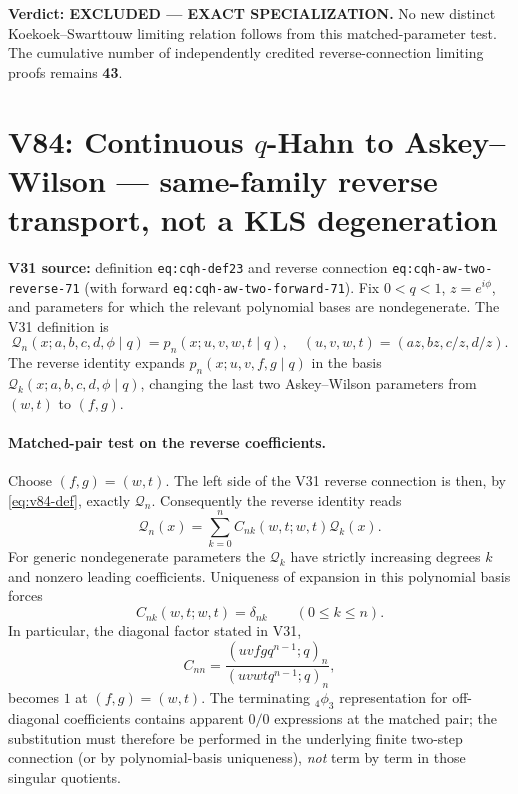 \documentclass[11pt]{article}
\begin{document}
\noindent\textbf{Verdict: EXCLUDED --- EXACT SPECIALIZATION.}
No new distinct Koekoek--Swarttouw limiting relation follows from
this matched-parameter test. The cumulative number of independently
credited reverse-connection limiting proofs remains \textbf{43}.


\section{V84: Continuous $q$-Hahn to Askey--Wilson --- same-family reverse transport, not a KLS degeneration}
\noindent\textbf{V31 source:} definition \texttt{eq:cqh-def23} and reverse connection \texttt{eq:cqh-aw-two-reverse-71} (with forward \texttt{eq:cqh-aw-two-forward-71}).
Fix $0<q<1$, $z=e^{i\phi}$, and parameters for which the relevant polynomial bases are nondegenerate. The V31 definition is
\begin{equation}\label{eq:v84-def}
 \mathscr Q_n(x;a,b,c,d,\phi\mid q)
 =p_n(x;u,v,w,t\mid q),\quad
 (u,v,w,t)=(az,bz,c/z,d/z).
\end{equation}
The reverse identity expands $p_n(x;u,v,f,g\mid q)$ in the basis $\mathscr Q_k(x;a,b,c,d,\phi\mid q)$, changing the last two Askey--Wilson parameters from $(w,t)$ to $(f,g)$.

\paragraph{Matched-pair test on the reverse coefficients.}
Choose $(f,g)=(w,t)$. The left side of the V31 reverse connection is then, by \eqref{eq:v84-def}, exactly $\mathscr Q_n$. Consequently the reverse identity reads
\[
 \mathscr Q_n(x)=\sum_{k=0}^n C_{nk}(w,t;w,t)\mathscr Q_k(x).
\]
For generic nondegenerate parameters the $\mathscr Q_k$ have strictly increasing degrees $k$ and nonzero leading coefficients. Uniqueness of expansion in this polynomial basis forces
\begin{equation}\label{eq:v84-identity}
 C_{nk}(w,t;w,t)=\delta_{nk}\qquad(0\le k\le n).
\end{equation}
In particular, the diagonal factor stated in V31,
\[
 C_{nn}=\frac{(uvfgq^{n-1};q)_n}{(uvwtq^{n-1};q)_n},
\]
becomes $1$ at $(f,g)=(w,t)$. The terminating ${}_4\phi_3$ representation for off-diagonal coefficients contains apparent $0/0$ expressions at the matched pair; the substitution must therefore be performed in the underlying finite two-step connection (or by polynomial-basis uniqueness), \emph{not} term by term in those singular quotients.
\end{document}
